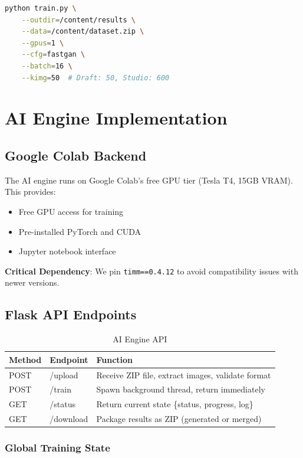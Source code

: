 \documentclass[11pt,a4paper]{article}
\begin{document}
\begin{lstlisting}[language=bash, caption=Training Command]
python train.py \
    --outdir=/content/results \
    --data=/content/dataset.zip \
    --gpus=1 \
    --cfg=fastgan \
    --batch=16 \
    --kimg=50  # Draft: 50, Studio: 600
\end{lstlisting}

\section{AI Engine Implementation}

\subsection{Google Colab Backend}

The AI engine runs on Google Colab's free GPU tier (Tesla T4, 15GB VRAM). This provides:
\begin{itemize}[noitemsep]
    \item Free GPU access for training
    \item Pre-installed PyTorch and CUDA
    \item Jupyter notebook interface
\end{itemize}

\textbf{Critical Dependency}: We pin \texttt{timm==0.4.12} to avoid compatibility issues with newer versions.

\subsection{Flask API Endpoints}

\begin{table}[H]
\centering
\small
\begin{tabular}{llp{5.5cm}}
\toprule
\textbf{Method} & \textbf{Endpoint} & \textbf{Function} \\
\midrule
POST & /upload & Receive ZIP file, extract images, validate format \\
POST & /train & Spawn background thread, return immediately \\
GET & /status & Return current state \{status, progress, log\} \\
GET & /download & Package results as ZIP (generated or merged) \\
\bottomrule
\end{tabular}
\caption{AI Engine API}
\end{table}

\subsubsection{Global Training State}
\end{document}
